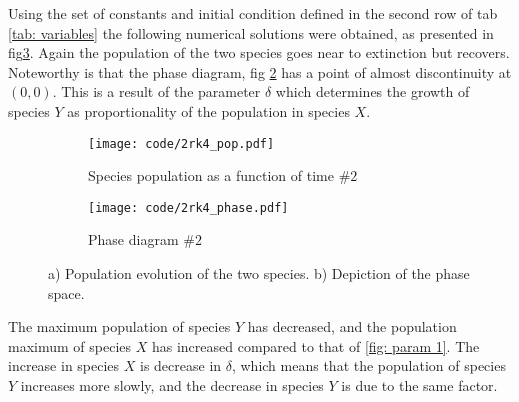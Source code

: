 \documentclass[a4paper]{article}
\begin{document}
\noindent
Using the set of constants and initial condition defined in the second row of tab \ref{tab: variables} the following numerical solutions were obtained, as presented in fig\ref{fig: param 2}. Again the population of the two species goes near to extinction but recovers. Noteworthy is that the phase diagram, fig \ref{fig: param 2 phase} has a point of almost discontinuity at $(0,0)$. This is a result of the parameter $\delta$ which determines the growth of species $Y$ as proportionality of the population in species $X$.
\begin{figure}[H]
    \centering
    \begin{subfigure}{0.45\textwidth}
        \texttt{[image: code/2rk4\_pop.pdf]}
        \caption{Species population as a function of time $\#2$}
        \label{fig: param 2 pop}
    \end{subfigure}
    \hfill    
    \begin{subfigure}{0.45\textwidth}
        \texttt{[image: code/2rk4\_phase.pdf]}
        \caption{Phase diagram $\#2$}
        \label{fig: param 2 phase}
    \end{subfigure}
    \caption{a) Population evolution of the two species. b) Depiction of the phase space.}
    \label{fig: param 2}
\end{figure}\noindent
The maximum population of species $Y$ has decreased, and the population maximum of species $X$ has increased compared to that of \ref{fig: param 1}. The increase in species $X$ is decrease in $\delta$, which means that the population of species $Y$ increases more slowly, and the decrease in species $Y$ is due to the same factor.
\end{document}
